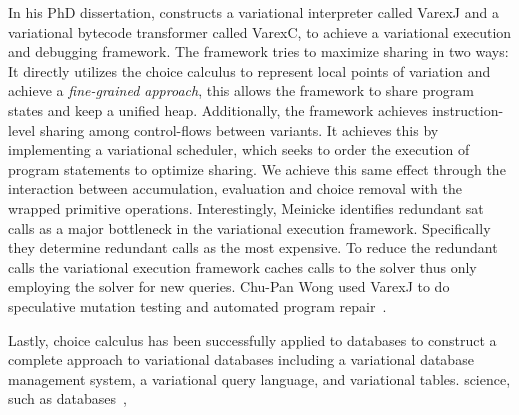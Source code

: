In his PhD dissertation, \citet{M14,JensDebugging} constructs a variational
interpreter called VarexJ and a variational bytecode transformer called VarexC,
to achieve a variational execution and debugging framework. The framework tries
to maximize sharing in two ways: It directly utilizes the choice calculus to
represent local points of variation and achieve a \emph{fine-grained approach},
this allows the framework to share program states and keep a unified heap.
Additionally, the framework achieves instruction-level sharing among
control-flows between variants. It achieves this by implementing a variational
scheduler, which seeks to order the execution of program statements to optimize
sharing. We achieve this same effect through the interaction between
accumulation, evaluation and choice removal with the wrapped primitive
operations. Interestingly, Meinicke identifies redundant \ac{sat} calls as a
major bottleneck in the variational execution framework. Specifically they
determine redundant  calls as the most expensive. To reduce the
redundant calls the variational execution framework caches calls to the solver
thus only employing the solver for new queries. Chu-Pan Wong used VarexJ to do
speculative mutation testing and automated program repair~\cite{ChuPanThesis}.


Lastly, choice calculus has been successfully applied to databases to construct
a complete approach to variational databases including a variational database
management system, a variational query language, and variational tables.
science, such as databases~\citep{ATW17dbpl,ATW18poly},


